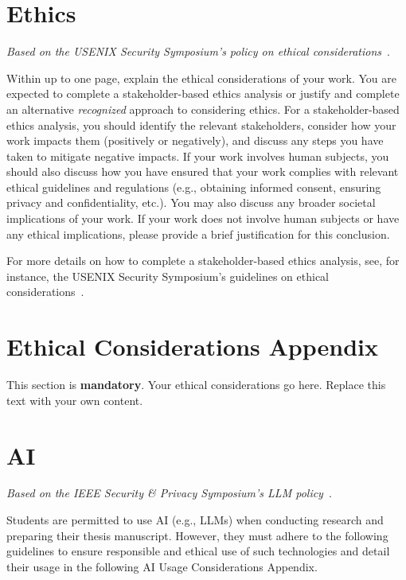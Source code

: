 \section*{Ethics}\label{s:ethical-considerations-appendix}

\emph{Based on the USENIX Security Symposium's policy on ethical considerations}~\cite{secethics}.

Within up to one page, explain the ethical considerations of your work. You are expected to complete a stakeholder-based ethics analysis or justify and complete an alternative \emph{recognized} approach to considering ethics. For a stakeholder-based ethics analysis, you should identify the relevant stakeholders, consider how your work impacts them (positively or negatively), and discuss any steps you have taken to mitigate negative impacts. If your work involves human subjects, you should also discuss how you have ensured that your work complies with relevant ethical guidelines and regulations (e.g., obtaining informed consent, ensuring privacy and confidentiality, etc.). You may also discuss any broader societal implications of your work. If your work does not involve human subjects or have any ethical implications, please provide a brief justification for this conclusion.

For more details on how to complete a stakeholder-based ethics analysis, see, for instance, the USENIX Security Symposium's guidelines on ethical considerations~\cite{secethics}.

\section{Ethical Considerations Appendix}
This section is \textbf{mandatory}. Your ethical considerations go here. Replace this text with your own content.

\section*{AI}\label{s:ethical-considerations-appendix}

\emph{Based on the IEEE Security \& Privacy Symposium's LLM policy}~\cite{spai}.

Students are permitted to use AI (e.g., LLMs) when conducting research and preparing their thesis manuscript. However, they must adhere to the following guidelines to ensure responsible and ethical use of such technologies and detail their usage in the following AI Usage Considerations Appendix.

